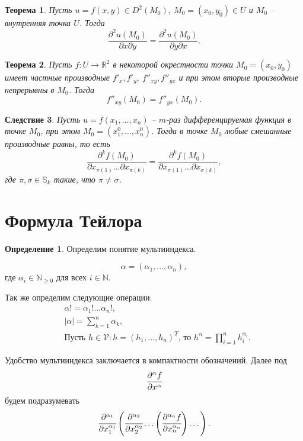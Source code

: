 \documentclass[oneside, final]{book}
\newcommand{\mbb}[1]{\mathbb{#1}}
\newcommand{\mcl}[1]{\mathcal{#1}}
\theoremstyle{plain}
\newtheorem{theorem}{Теорема}[chapter]
\newtheorem{corollary}[theorem]{Следствие}
\theoremstyle{definition}
\newtheorem{mdef}{Определение}[chapter]
\begin{document}
	\begin{theorem}\label{th1}
		Пусть $u = f(x,y) \in D^2(M_0)$, $M_0 = (x_0, y_0) \in U$ и $M_0$ -- внутренняя точка $U$.
		Тогда
		$$
		\frac {\partial^2 u(M_0)} {\partial x \partial y} = \frac {\partial^2 u(M_0)} {\partial y \partial x}.
		$$
	\end{theorem}

	\begin{theorem}
		Пусть $f\colon U \to \mbb R^2$ в некоторой окрестности точки $M_0 = (x_0, y_0)$ имеет частные производные $f'_x, f'_y$, $f''_{xy}, f''_{yx}$ и при этом вторые производные непрерывны в $M_0$.
		Тогда
		$$
		f''_{xy}(M_0) = f''_{yx}(M_0).
		$$
	\end{theorem}

	\begin{corollary}
		Пусть $u = f(x_1, \ldots, x_n)$ -- $m$-раз дифференцируемая функция в точке $M_0$, при этом $M_0 = (x_1^0, \ldots, x_n^0)$.
		Тогда в точке $M_0$ любые смешанные производные равны, то есть
		$$
		\frac {\partial^k f(M_0)} {\partial x_{\pi(1)} \ldots \partial x_{\pi(k)}} = \frac {\partial^k f(M_0)} {\partial x_{\sigma(1)} \ldots \partial x_{\sigma(k)}},
		$$
		где $\pi, \sigma \in \mbb S_k$ такие, что $\pi \not= \sigma$.
	\end{corollary}
	\section{Формула Тейлора}
	\begin{mdef}
		Определим понятие мультииндекса.
		
		$$
			\alpha = (\alpha_1, \ldots, \alpha_n),
		$$
		где $\alpha_i \in \mbb N_{\ge 0}$ для всех $i \in \mbb N$.
		
		Так же определим следующие операции:
		\begin{align*}
			&\alpha! = \alpha_1!\dots \alpha_n!,\\
			&|\alpha| = \sum\limits_{k=1}^n \alpha_k,\\
			&\text{Пусть $h \in \mcl V: h = (h_1, \ldots, h_n)^T$, то } h^{\alpha} = \prod \limits_{i=1}^n h_i^{\alpha_i}. 
		\end{align*}
		
		Удобство мультииндекса заключается в компактности обозначений. Далее под 
		$$
			\cfrac {\partial^{\alpha}f} {\partial x^{\alpha}}
		$$	
		будем подразумевать
		$$
			\cfrac {\partial^{\alpha_1}} {\partial x_1^{\alpha_1}} \left(\cfrac {\partial^{\alpha_2}} {\partial x_2^{\alpha_2}}\dots \left(\cfrac {\partial^{\alpha_n}f} {\partial x_n^{\alpha_n}}\right)\dots\right).
		$$
	\end{mdef}
\end{document}
